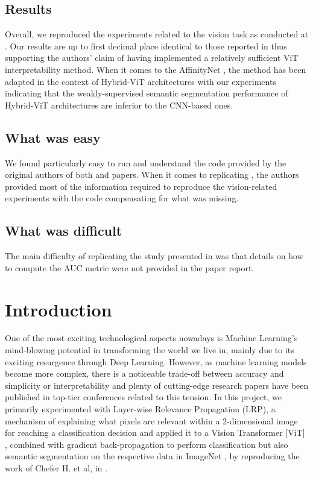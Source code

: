 \subsection{Results}
Overall, we reproduced the experiments related to the vision task as conducted at \cite{mainpaper}. Our results are up to first decimal place identical to those reported in \cite{mainpaper} thus supporting the authors' claim of having implemented a relatively sufficient ViT interpretability method. When it comes to the AffinityNet \cite{ahn2018learning}, the method has been adapted in the context of Hybrid-ViT architectures with our experiments indicating that the weakly-supervised semantic segmentation performance of Hybrid-ViT architectures are inferior to the CNN-based ones.


\subsection{What was easy}
We found particularly easy to run and understand the code provided by the original authors of both \cite{mainpaper} and \cite{ahn2018learning} papers. When it comes to replicating \cite{mainpaper}, the authors provided most of the information required to reproduce the vision-related experiments with the code compensating for what was missing.


\subsection{What was difficult}
The main difficulty of replicating the study presented in \cite{mainpaper} was that details on how to compute the AUC metric were not provided in the paper report. 

\clearpage

\section{Introduction}
\label{section:intro}
One of the most exciting technological aspects nowadays is Machine Learning's mind-blowing potential in transforming the world we live in, mainly due to its exciting resurgence through Deep Learning. However, as machine learning models become more complex, there is a noticeable trade-off between accuracy and simplicity or interpretability \cite{explanations} and plenty of cutting-edge research papers have been published in top-tier conferences related to this tension. In this project, we primarily experimented with Layer-wise Relevance Propagation (LRP), a mechanism of explaining what pixels are relevant within a 2-dimensional image for reaching a classification decision \cite{renormalizationLRP} and applied it to a Vision Transformer [ViT] \cite{visiontransformer}, combined with gradient back-propagation to perform classification but also semantic segmentation on the respective data in ImageNet \cite{russakovsky2015ImageNet, imagenet-seg}, by reproducing the work of Chefer H. et al, in \cite{mainpaper}.

